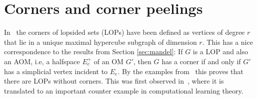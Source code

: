 \documentclass[final,11pt]{article}
\newtheorem{thm}{Theorem}[section]
\begin{document}
\section{Corners and corner peelings}\label{sec:sec5corners}

In~\cite{Cha-18} the corners of lopsided sets (LOPs) have been defined as vertices of degree $r$ that lie in a unique maximal hypercube subgraph of dimension $r$. This has a nice correspondence to the results from Section \ref{sec:mandel}:
If $G$ is a LOP and also an AOM, i.e, a halfspace $E^+_e$ of an OM $G'$, then $G$ has a corner if and only if $G'$ has a simplicial vertex incident to $E_e$. By the examples from~\cite{Cha-18,Tra-04,Ban-96} this proves that there are LOPs without corners. This was first observed in~\cite{Cha-18}, where it is translated to an important counter example in computational learning theory. 
 



%
\end{document}
